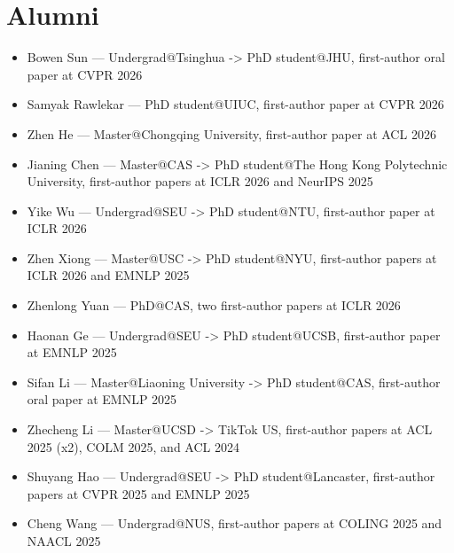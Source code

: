 \section*{Alumni}
\begin{itemize}
\item Bowen Sun — Undergrad@Tsinghua -> PhD student@JHU, first-author oral paper at CVPR 2026
\item Samyak Rawlekar — PhD student@UIUC, first-author paper at CVPR 2026
\item Zhen He — Master@Chongqing University, first-author paper at ACL 2026
\item Jianing Chen — Master@CAS -> PhD student@The Hong Kong Polytechnic University, first-author papers at ICLR 2026 and NeurIPS 2025
\item Yike Wu — Undergrad@SEU -> PhD student@NTU, first-author paper at ICLR 2026
\item Zhen Xiong — Master@USC -> PhD student@NYU, first-author papers at ICLR 2026 and EMNLP 2025
\item Zhenlong Yuan — PhD@CAS, two first-author papers at ICLR 2026
\item Haonan Ge — Undergrad@SEU -> PhD student@UCSB, first-author paper at EMNLP 2025
\item Sifan Li — Master@Liaoning University -> PhD student@CAS, first-author oral paper at EMNLP 2025
\item Zhecheng Li — Master@UCSD -> TikTok US, first-author papers at ACL 2025 (x2), COLM 2025, and ACL 2024
\item Shuyang Hao — Undergrad@SEU -> PhD student@Lancaster, first-author papers at CVPR 2025 and EMNLP 2025
\item Cheng Wang — Undergrad@NUS, first-author papers at COLING 2025 and NAACL 2025
\end{itemize}
